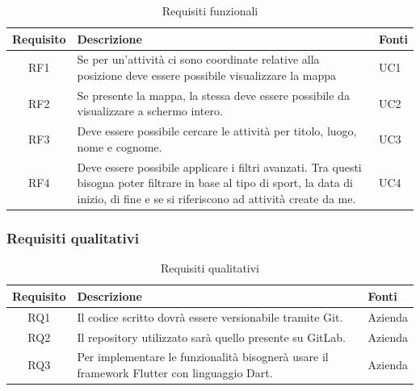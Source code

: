 \begin{center}
	\begin{table}[h!]
		
		\label{tab:Requisiti funzionali}
		\begin{tabularx}{\textwidth}{|c|p{8cm}|p{2.1cm}|}
			
			\hline
			\textbf{Requisito} & \centering\textbf{Descrizione} & \textbf{Fonti}  \\\hline
			
			RF1 & Se per un'attività ci sono coordinate relative alla posizione deve essere possibile visualizzare la mappa  & UC1\\
			\hline	
			RF2 &Se presente la mappa, la stessa deve essere possibile da visualizzare a schermo intero. & UC2\\
			\hline
			RF3& Deve essere possibile cercare le attività per titolo, luogo, nome e cognome.	& UC3	\\
			\hline	
			RF4& Deve essere possibile applicare i filtri avanzati. Tra questi bisogna poter filtrare in base al tipo di sport, la data di inizio, di fine e se si riferiscono ad attività create da me.	& UC4	\\
			\hline		
		\end{tabularx}
		\vspace{0.3cm}
		\caption{Requisiti funzionali}
	\end{table}
\end{center}

\newpage

\subsubsection{Requisiti qualitativi}

\begin{center}
	\begin{table}[h!]
		
		\label{tab:Requisiti qualitativi}
		\begin{tabularx}{\textwidth}{|c|p{8cm}|p{2.1cm}|}
			
			\hline
			\textbf{Requisito} & \centering\textbf{Descrizione} & \textbf{Fonti}  \\\hline
			
			RQ1 &Il codice scritto dovrà essere versionabile tramite Git.  & Azienda\\
			\hline	
			RQ2 &Il repository utilizzato sarà quello presente su GitLab. & Azienda\\
			\hline
			RQ3& Per implementare le funzionalità bisognerà usare il framework Flutter con linguaggio Dart.	& Azienda	\\
			\hline		
		\end{tabularx}
		\vspace{0.3cm}
		\caption{Requisiti qualitativi}
	\end{table}
\end{center}

